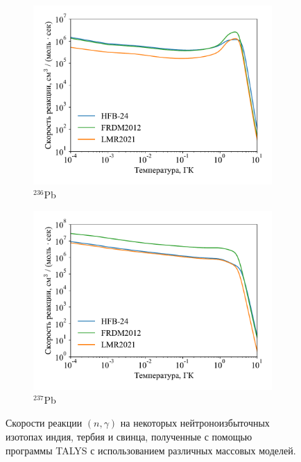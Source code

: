 \begin{figure}
\begin{subfigure}{0.48\textwidth}
    \includegraphics[width=\textwidth]{pics/rate_pb236.pdf}
    \caption{${}^{236}$Pb}
    \label{fig:ng_rate:236pb}
  \end{subfigure}
  \hfil
  \begin{subfigure}{0.48\textwidth}
    \centering
    \includegraphics[width=\textwidth]{pics/rate_pb237.pdf}
    \caption{${}^{237}$Pb}
    \label{fig:ng_rate:237pb}
  \end{subfigure}
  \caption{Скорости реакции $(n,\gamma)$ на некоторых нейтроноизбыточных изотопах индия, тербия и свинца, полученные с помощью программы TALYS с использованием различных массовых моделей.}
  \label{fig:ng_rate}
\end{figure}


